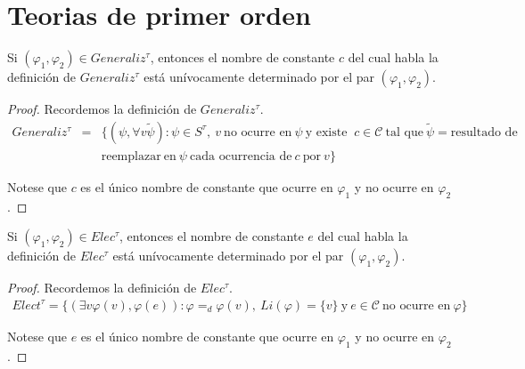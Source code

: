 \section{Teorias de primer orden}

  \begin{lemma}
    \PN Si $(\varphi_{1}, \varphi_{2}) \in Generaliz^{\tau}$, entonces el nombre de constante $c$ del cual habla la
    definición de $Generaliz^{\tau}$ está unívocamente determinado por el par $(\varphi_{1}, \varphi_{2})$.
  \end{lemma}
  \begin{proof}
    \PN Recordemos la definición de $Generaliz^{\tau}$.
    \begin{eqnarray*}
      Generaliz^{\tau} &=& \{(\psi, \forall v \tilde{\psi}): \psi \in S^{\tau}, \ v \ \text{no ocurre en} \ \psi \
      \text{y existe } \ c \in \mathcal{C} \ \text{tal que} \ \tilde{\psi} = \text{resultado de} \\
      && \text{reemplazar} \ \text{en} \ \psi \ \text{cada ocurrencia de} \ c \ \text{por} \ v\}
    \end{eqnarray*}

    \PN Notese que $c$ es el único nombre de constante que ocurre en $\varphi_{1}$ y no ocurre en $\varphi_{2}$.
  \end{proof}

  \begin{lemma}
    \PN Si $(\varphi_{1}, \varphi_{2}) \in Elec^{\tau}$, entonces el nombre de constante $e$ del cual habla la
    definición de $Elec^{\tau}$ está unívocamente determinado por el par $(\varphi_{1}, \varphi_{2})$.
  \end{lemma}
  \begin{proof}
    \PN Recordemos la definición de $Elec^{\tau}$.
    \begin{eqnarray*}
      Elect^{\tau} = \{(\exists v \varphi(v), \varphi(e)): \varphi =_{d} \varphi(v), \ Li(\varphi) = \{v\} \ \text{y} \
      e \in \mathcal{C} \ \text{no ocurre en} \ \varphi\}
    \end{eqnarray*}

    \PN Notese que $e$ es el único nombre de constante que ocurre en $\varphi_{1}$ y no ocurre en $\varphi_{2}$.
  \end{proof}

